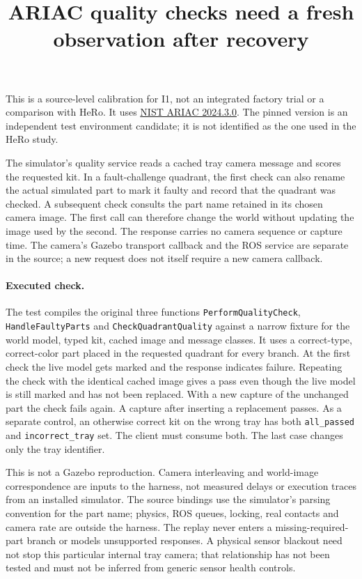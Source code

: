 \documentclass{article}
\title{ARIAC quality checks need a fresh observation after recovery}
\date{}
\begin{document}
\maketitle
This is a source-level calibration for I1, not an integrated factory
trial or a comparison with HeRo. It uses
\href{https://github.com/usnistgov/ARIAC/commit/ffc825757dc05cc6e4dfbd5c2483e993aab35652}{NIST ARIAC 2024.3.0}.
The pinned version is an independent test environment candidate;
it is not identified as the one used in the HeRo study.

The simulator's quality service reads a cached tray camera message
and scores the requested kit. In a fault-challenge quadrant, the
first check can also rename the actual simulated part to mark it
faulty and record that the quadrant was checked. A subsequent
check consults the part name retained in its chosen camera image.
The first call can therefore change the world without updating the
image used by the second. The response carries no camera sequence
or capture time. The camera's Gazebo transport callback and the
ROS service are separate in the source; a new request does not
itself require a new camera callback.

\paragraph{Executed check.}
The test compiles the original three functions
\texttt{PerformQualityCheck}, \texttt{HandleFaultyParts} and
\texttt{CheckQuadrantQuality} against a narrow fixture for the
world model, typed kit, cached image and message classes.
It uses a correct-type, correct-color part placed in the requested
quadrant for every branch. At the first check the live model
gets marked and the response indicates failure. Repeating the
check with the identical cached image gives a pass even though
the live model is still marked and has not been replaced. With
a new capture of the unchanged part the check fails again.
A capture after inserting a replacement passes. As a separate
control, an otherwise correct kit on the wrong tray has both
\texttt{all\_passed} and \texttt{incorrect\_tray} set. The client
must consume both. The last case changes only the tray identifier.

This is not a Gazebo reproduction. Camera interleaving and
world-image correspondence are inputs to the harness, not measured
delays or execution traces from an installed simulator. The source
bindings use the simulator's parsing convention for the part name;
physics, ROS queues, locking, real contacts and camera rate are
outside the harness. The replay never enters a missing-required-part
branch or models unsupported responses. A physical sensor blackout
need not stop this particular internal tray camera; that relationship
has not been tested and must not be inferred from generic sensor
health controls.
\end{document}
